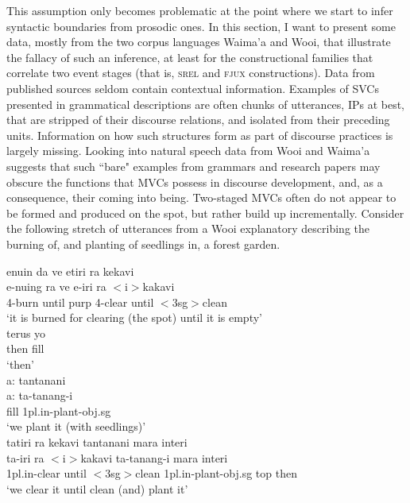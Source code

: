 This assumption only becomes problematic at the point where we start to infer syntactic boundaries from prosodic ones. In this section, I want to present some data, mostly from the two corpus languages Waima'a and Wooi, that illustrate the fallacy of such an inference, at least for the constructional families that correlate two event stages (that is, \textsc{srel} and \textsc{fjux} constructions). Data from published sources seldom contain contextual information. Examples of SVCs presented in grammatical descriptions are often chunks of utterances, IPs at best, that are stripped of their discourse relations, and isolated from their preceding units. Information on how such structures form as part of discourse practices is largely missing. Looking into natural speech data from Wooi and Waima'a suggests that such ``bare" examples from grammars and research papers may obscure the functions that MVCs possess in discourse development, and, as a consequence, their coming into being. Two-staged MVCs often do not appear to be formed and produced on the spot, but rather build up incrementally. Consider the following stretch of utterances from a Wooi explanatory describing the burning of, and planting of seedlings in, a forest garden.  

\pex \label{Wooi_gardening1}
\a 
\gll enuin da ve etiri ra kekavi \\
e-nuing ra ve e-iri ra $<$i$>$kakavi \\
\glc \acs{4}-burn until \acs{purp} \acs{4}-clear until $<$\acs{3}\acs{sg}$>$clean \\
\glft `it is burned for clearing (the spot) until it is empty' \\ 
\z
\a
\gll terus yo \\
then \acs{fill} \\
\glft `then' \\ 
\z
\a
\gll a: tantanani \\
a: ta-tanang-i \\
\glc \acs{fill} \acs{1}\acs{pl}.\acs{in}-plant-\acs{obj}.\acs{sg} \\
\glft `we plant it (with seedlings)' \\ 
\z
\a 
\gll tatiri ra kekavi tantanani mara interi \\ 
ta-iri ra $<$i$>$kakavi ta-tanang-i mara interi \\
\glc \acs{1}\acs{pl}.\acs{in}-clear until $<$\acs{3}\acs{sg}$>$clean \acs{1}\acs{pl}.\acs{in}-plant-\acs{obj}.\acs{sg} \acs{top} then \\
\glft `we clear it until clean (and) plant it' \\ 
\z
\xe

